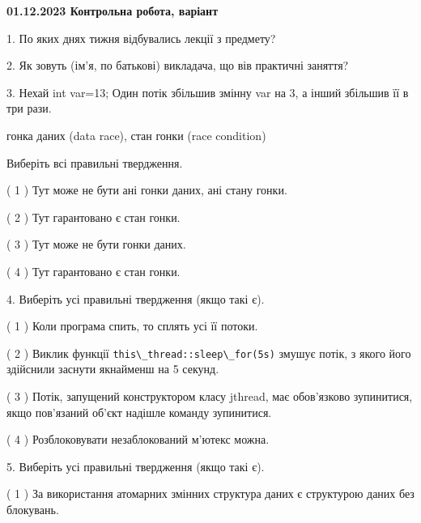 \documentclass[12pt, ukrainian]{article}
\def\code#1{\Verb!#1!}
\begin{document}
\vspace{4mm}
\newpage
\begin {large}

\textbf{01.12.2023 Контрольна робота, варіант  }\par


{
1. По яких днях тижня відбувались лекції з предмету?



\vspace{5mm}
2. Як зовуть (ім'я, по батькові) викладача, що вів практичні заняття?



\vspace{5mm}
3. Нехай int var=13; Один потік збільшив змінну var на 3, а інший збільшив її в три рази.

гонка даних (data race), стан гонки (race condition)

Виберіть всі правильні твердження.\par
\vspace{2mm}
( 1 ) Тут може не бути ані гонки даних, ані стану гонки.%

( 2 ) Тут гарантовано є стан гонки.%

( 3 ) Тут може не бути гонки даних.%

( 4 ) Тут гарантовано є стан гонки.%


\vspace{5mm}
4. Виберіть усі правильні твердження (якщо такі є).\par
\vspace{2mm}

( 1 ) Коли програма спить, то сплять усі її потоки.%

( 2 ) Виклик функції \code{this\_thread::sleep\_for(5s)} змушує потік, з якого його здійснили заснути якнайменш на 5 секунд.%

( 3 ) Потік, запущений конструктором класу jthread, має обов’язково зупинитися, якщо пов’язаний об’єкт надішле команду зупинитися.%

( 4 ) Розблоковувати незаблокований м’ютекс можна.%


\vspace{5mm}
5. Виберіть усі правильні твердження (якщо такі є).\par
\vspace{2mm}

( 1 ) За використання атомарних змінних структура даних є структурою даних без блокувань.%

}
\end{large}
\end{document}
